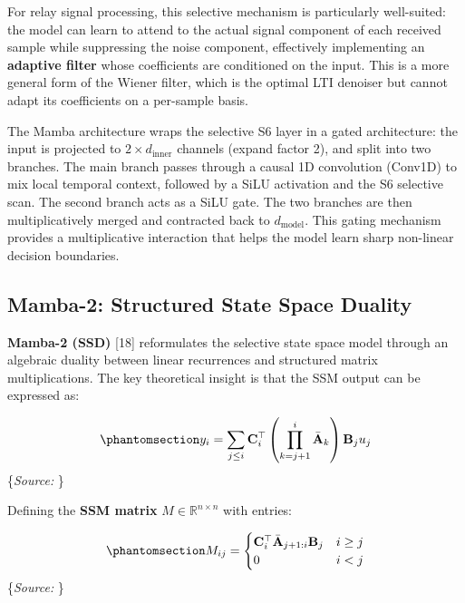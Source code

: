 \documentclass[
  english,
  12pt,
  12pt,
  a4paper,
  oneside]{report}
\begin{document}
For relay signal processing, this selective mechanism is particularly well-suited: the model can learn to attend to the actual signal component of each received sample while suppressing the noise component, effectively implementing an \textbf{adaptive filter} whose coefficients are conditioned on the input. This is a more general form of the Wiener filter, which is the optimal LTI denoiser but cannot adapt its coefficients on a per-sample basis.

The Mamba architecture wraps the selective S6 layer in a gated architecture: the input is projected to \(2 \times d_{\text{inner}}\) channels (expand factor 2), and split into two branches. The main branch passes through a causal 1D convolution (Conv1D) to mix local temporal context, followed by a SiLU activation and the S6 selective scan. The second branch acts as a SiLU gate. The two branches are then multiplicatively merged and contracted back to \(d_{\text{model}}\). This gating mechanism provides a multiplicative interaction that helps the model learn sharp non-linear decision boundaries.

\subsection{Mamba-2: Structured State Space Duality}\label{sec:mamba-2-structured-state-space-duality}

\textbf{Mamba-2 (SSD)} {[}18{]} reformulates the selective state space model through an algebraic duality between linear recurrences and structured matrix multiplications. The key theoretical insight is that the SSM output can be expressed as:

\begin{equation}\protect\phantomsection\label{eq:mamba-ssd-output}{y_i = \sum_{j \leq i} \mathbf{C}_i^\top \left(\prod_{k=j+1}^{i} \bar{\mathbf{A}}_k\right) \mathbf{B}_j u_j
}\end{equation} \footnotesize\{\textit{Source: \1}\}\normalsize

Defining the \textbf{SSM matrix} \(M \in \mathbb{R}^{n \times n}\) with entries:

\begin{equation}\protect\phantomsection\label{eq:mamba-ssd-matrix}{M_{ij} = \begin{cases} \mathbf{C}_i^\top \bar{\mathbf{A}}_{j+1:i} \mathbf{B}_j & i \geq j \\ 0 & i < j \end{cases}
}\end{equation} \footnotesize\{\textit{Source: \1}\}\normalsize
\end{document}
